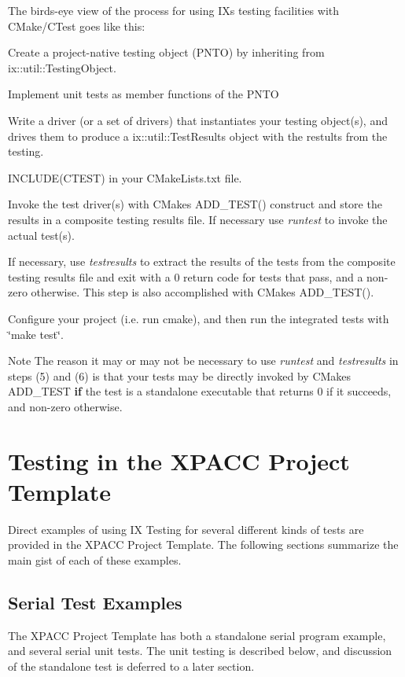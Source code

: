 The birds-\/eye view of the process for using IX\textquotesingle{}s testing facilities with C\+Make/\+C\+Test goes like this\+:
\begin{DoxyEnumerate}
\item Create a project-\/native testing object (P\+N\+TO) by inheriting from ix\+::util\+::\+Testing\+Object.
\item Implement unit tests as member functions of the P\+N\+TO
\item Write a driver (or a set of drivers) that instantiates your testing object(s), and drives them to produce a ix\+::util\+::\+Test\+Results object with the restults from the testing.
\item I\+N\+C\+L\+U\+D\+E(\+C\+T\+E\+S\+T) in your C\+Make\+Lists.\+txt file.
\item Invoke the test driver(s) with C\+Make\textquotesingle{}s A\+D\+D\+\_\+\+T\+E\+S\+T() construct and store the results in a composite testing results file. If necessary use {\itshape runtest} to invoke the actual test(s).
\item If necessary, use {\itshape testresults} to extract the results of the tests from the composite testing results file and exit with a 0 return code for tests that pass, and a non-\/zero otherwise. This step is also accomplished with C\+Make\textquotesingle{}s A\+D\+D\+\_\+\+T\+E\+S\+T().
\item Configure your project (i.\+e. run cmake), and then run the integrated tests with \char`\"{}make test\char`\"{}.
\end{DoxyEnumerate}

\begin{DoxyNote}{Note}
The reason it may or may not be necessary to use {\itshape runtest} and {\itshape testresults} in steps (5) and (6) is that your tests may be directly invoked by C\+Make\textquotesingle{}s A\+D\+D\+\_\+\+T\+E\+ST {\bfseries if} the test is a standalone executable that returns 0 if it succeeds, and non-\/zero otherwise.
\end{DoxyNote}
\hypertarget{testingproject_guide_ixpt_testing}{}\section{Testing in the X\+P\+A\+C\+C Project Template}\label{testingproject_guide_ixpt_testing}
Direct examples of using IX Testing for several different kinds of tests are provided in the X\+P\+A\+CC Project Template. The following sections summarize the main gist of each of these examples.\hypertarget{testingproject_guide_ixpt_serial_tests}{}\subsection{Serial Test Examples}\label{testingproject_guide_ixpt_serial_tests}
The X\+P\+A\+CC Project Template has both a standalone serial program example, and several serial unit tests. The unit testing is described below, and discussion of the standalone test is deferred to a later section.

